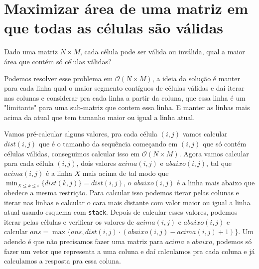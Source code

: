 
\section{Maximizar área de uma matriz em que todas as células são válidas}
Dado uma matriz $N\times M$, cada célula pode ser válida ou inválida, qual a maior área que contém só células válidas?

Podemos resolver esse problema em $\mathcal{O}(N \times M)$, a ideia da solução é manter para cada linha qual o maior segmento contíguos de células válidas e daí iterar nas colunas e considerar pra cada linha a partir da coluna, que essa linha é um "limitante" para uma sub-matriz que contem essa linha. E manter as linhas mais acima da atual que tem tamanho maior ou igual a linha atual.

Vamos pré-calcular alguns valores, pra cada célula $(i,j)$ vamos calcular $dist(i,j)$ que é o tamanho da sequência começando em $(i,j)$ que só contém células válidas, conseguimos calcular isso em $\mathcal{O}(N \times M)$. Agora vamos calcular para cada célula $(i,j)$, dois valores $acima(i,j)$ e $abaixo(i,j)$, tal que $acima(i,j)$ é a linha $X$ mais acima de tal modo que $\displaystyle \min_{X \le k \le i}\{dist(k,j)\} = dist(i,j)$, o $abaixo(i,j)$ é a linha mais abaixo que obedece a mesma restrição. Para calcular isso podemos iterar pelas colunas e iterar nas linhas e calcular o cara mais distante com valor maior ou igual a linha atual usando esquema com \texttt{stack}. Depois de calcular esses valores, podemos iterar pelas células e verificar os valores de $acima(i,j)$ e $abaixo(i,j)$ e calcular $ans = \max\{ans, dist(i,j) \cdot (abaixo(i,j) - acima(i,j) + 1)\}$. Um adendo é que não precisamos fazer uma matriz para $acima$ e $abaixo$, podemos só fazer um vetor que representa a uma coluna e daí calculamos pra cada coluna e já calculamos a resposta pra essa coluna.

